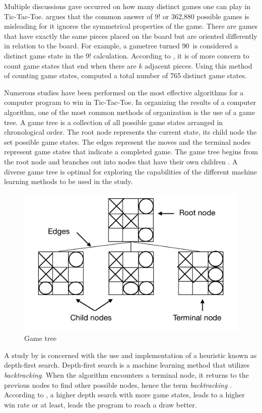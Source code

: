 \documentclass{strrespaper-trad}
\newcommand{\ttt}{Tic-Tac-Toe}
\begin{document}
			Multiple discussions gave occurred on how many distinct games one can play in \ttt.
			\textcite{schaeferHowManyGames2002} argues that the common answer of 9! or 362,880 possible games is misleading for it ignores the symmetrical properties of the game.
			There are games that have exactly the same pieces placed on the board but are oriented differently in relation to the board.
			For example, a gametree turned 90\textdegree\ is considered a distinct game state in the 9! calculation.
			According to \textcite{schaeferHowManyGames2002}, it is of more concern to count game states that end when there are $k$ adjacent pieces.
			Using this method of counting game states, \textcite{schaeferHowManyGames2002} computed a total number of 765 distinct game states.

			Numerous studies have been performed on the most effective algorithms for a computer program to win in \ttt.
			In organizing the results of a computer algorithm, one of the most common methods of organization is the use of a game tree.
			A game tree is a collection of all possible game states arranged in chronological order.
			The root node represents the current state, its child node the set possible game states.
			The edges represent the moves and the terminal nodes represent game states that indicate a completed game.
			The game tree begins from the root node and branches out into nodes that have their own children \autocite{adamchikGameTrees2009}.
			A diverse game tree is optimal for exploring the capabilities of the different machine learning methods to be used in the study.

			\begin{figure}
				\centering
				\includegraphics[width=0.7\linewidth]{gametree}
				\caption{Game tree}
				\label{fig:gametree}
			\end{figure}

			A study by \textcite{cranenburghTicTacToe2007} is concerned with the use and implementation of a heuristic known as depth-first search. Depth-first search is a machine learning method that utilizes \textit{backtracking}.
			When the algorithm encounters a terminal node, it returns to the previous nodes to find other possible nodes, hence the term \textit{backtracking} \autocite{hackerearthDepthFirstSearch2019}.
			According to \textcite{cranenburghTicTacToe2007}, a higher depth search with more game states, leads to a higher win rate or at least, leads the program to reach a draw better.
\end{document}
